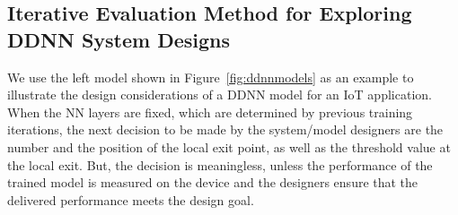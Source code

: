 \documentclass[format=acmsmall, review=false, screen=true]{acmart}
\def\figurename{Figure}
\begin{document}
%
%


\subsection{Iterative Evaluation Method for Exploring DDNN System Designs}
We use the left model shown in \figurename~\ref{fig:ddnnmodels} as an example to illustrate the design considerations of a DDNN model for an IoT application. When the NN layers are fixed, which are determined by previous training iterations, the next decision to be made by the system/model designers are the number and the position of the local exit point, as well as the threshold value at the local exit. But, the decision is meaningless, unless the performance of the trained model is measured on the device and the designers ensure that the delivered performance meets the design goal.
\end{document}
